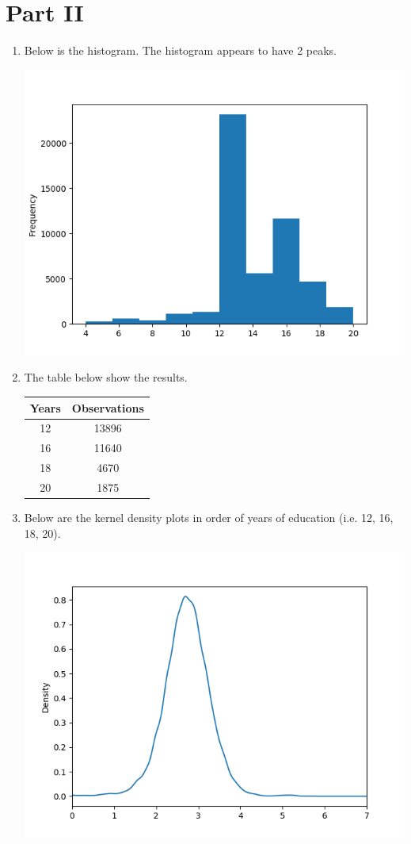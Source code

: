 \documentclass{article}
\begin{document}
\section{Part II}
\begin{enumerate}[label=\alph*)]
\item

Below is the histogram. The histogram appears to have 2 peaks.

\includegraphics[scale=.8]{part_a}

\item The table below show the results.

\begin{tabular}{ c c }
 Years & Observations \\
 \hline
 12 & 13896 \\ 
 16 & 11640 \\ 
 18 & 4670  \\ 
 20 & 1875 
\end{tabular}


\item

Below are the kernel density plots in order of years of education (i.e. 12, 16, 18, 20).

\includegraphics[scale=.8]{part_b_12}


\end{enumerate}
\end{document}
